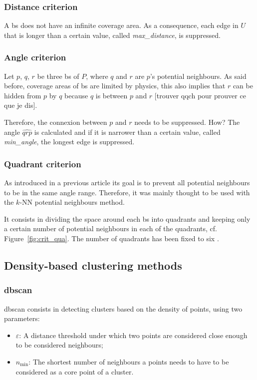 \documentclass[lettersize,journal,english]{IEEEtran}
\begin{document}
        \subsubsection{Distance criterion}
            A \acrshort{bs} does not have an infinite coverage area.
            As a consequence, each edge in $U$ that is longer than a certain value, called \emph{max\_distance}, is suppressed.

        \subsubsection{Angle criterion}
            Let $p$, $q$, $r$ be three \acrshort{bs} of $P$, where $q$ and $r$ are $p$'s potential neighbours. As said before, coverage areas of \acrshort{bs} are limited by physics, this also implies that $r$ can be \og hidden\fg{} from $p$ by $q$ because $q$ is between $p$ and $r$ [trouver qqch pour prouver ce que je dis].

            Therefore, the connexion between $p$ and $r$ needs to be suppressed. How? The angle $\widehat{qrp}$ is calculated and if it is narrower than a certain value, called \emph{min\_angle}, the longest edge is suppressed.

        \subsubsection{Quadrant criterion}
            As introduced in a previous article \cite{10201211} its goal is to prevent all potential neighbours to be in the same angle range. Therefore, it was mainly thought to be used with the $k$-NN potential neighbours method.

            It consists in dividing the space around each \acrshort{bs} into quadrants and keeping only a certain number of potential neighbours in each of the quadrants, cf. Figure~\ref{fig:crit_qua}.
            The number of quadrants has been fixed to six \cite{art_del_paq}.

    \subsection{Density-based clustering methods}
        \subsubsection{\acrshort{dbscan}}
            \acrshort{dbscan} consists in detecting clusters based on the density of points, using two parameters:
            \begin{itemize}
                \item $\varepsilon$: A distance threshold under which two points are considered close enough to be considered neighbours;   
                \item $n_{\text{min}}$: The shortest number of neighbours a points needs to have to be considered as a core point of a cluster.
            \end{itemize}
\end{document}
